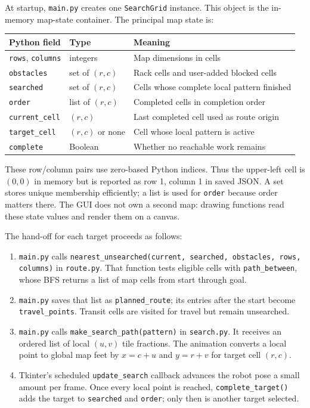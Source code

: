 \documentclass[11pt]{article}
\begin{document}
At startup, \texttt{main.py} creates one \texttt{SearchGrid} instance. This
object is the in-memory map-state container. The principal map state is:
\begin{center}
\begin{tabular}{lll}
\toprule
Python field & Type & Meaning \\
\midrule
\texttt{rows}, \texttt{columns} & integers & Map dimensions in cells \\
\texttt{obstacles} & set of $(r,c)$ & Rack cells and user-added blocked cells \\
\texttt{searched} & set of $(r,c)$ & Cells whose complete local pattern finished \\
\texttt{order} & list of $(r,c)$ & Completed cells in completion order \\
\texttt{current\_cell} & $(r,c)$ & Last completed cell used as route origin \\
\texttt{target\_cell} & $(r,c)$ or none & Cell whose local pattern is active \\
\texttt{complete} & Boolean & Whether no reachable work remains \\
\bottomrule
\end{tabular}
\end{center}

These row/column pairs use zero-based Python indices. Thus the upper-left cell
is $(0,0)$ in memory but is reported as row 1, column 1 in saved JSON. A set
stores unique membership efficiently; a list is used for \texttt{order}
because order matters there. The GUI does not own a second map: drawing
functions read these state values and render them on a canvas.

The hand-off for each target proceeds as follows:
\begin{enumerate}
  \item \texttt{main.py} calls
        \texttt{nearest\_unsearched(current, searched, obstacles, rows, columns)}
        in \texttt{route.py}. That function tests eligible cells with
        \texttt{path\_between}, whose BFS returns a list of map cells from
        start through goal.
  \item \texttt{main.py} saves that list as \texttt{planned\_route}; its
        entries after the start become \texttt{travel\_points}. Transit cells
        are visited for travel but remain unsearched.
  \item \texttt{main.py} calls \texttt{make\_search\_path(pattern)} in
        \texttt{search.py}. It receives an ordered list of local $(u,v)$ tile
        fractions. The animation converts a local point to global map feet by
        $x=c+u$ and $y=r+v$ for target cell $(r,c)$.
  \item Tkinter's scheduled \texttt{update\_search} callback advances the
        robot pose a small amount per frame. Once every local point is reached,
        \texttt{complete\_target()} adds the target to \texttt{searched} and
        \texttt{order}; only then is another target selected.
\end{enumerate}
\end{document}
